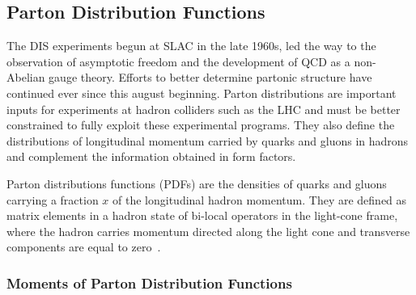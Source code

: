 \subsection{Parton Distribution Functions}



The DIS experiments begun at SLAC in the late 1960s, led the way to the observation of asymptotic freedom and the development of QCD as a non-Abelian gauge theory. Efforts to better determine partonic structure have continued ever since this august beginning. Parton distributions are important inputs for experiments at hadron colliders such as the LHC and must be better constrained to fully exploit these experimental programs. They also define the distributions of longitudinal momentum carried by quarks and gluons in hadrons and complement the information obtained in form factors.

Parton distributions functions (PDFs)  are the densities 
of quarks and gluons carrying a fraction $x$ of the longitudinal hadron momentum.
They  are defined as matrix 
elements in a hadron state of bi-local operators in the light-cone frame, where 
the hadron carries momentum directed along the light cone and
transverse components are equal to zero~\cite{Collins:1981uw,Curci:1980uw,Baulieu:1979mr,Collins:1989gx}.


\subsubsection{Moments of Parton Distribution Functions}

